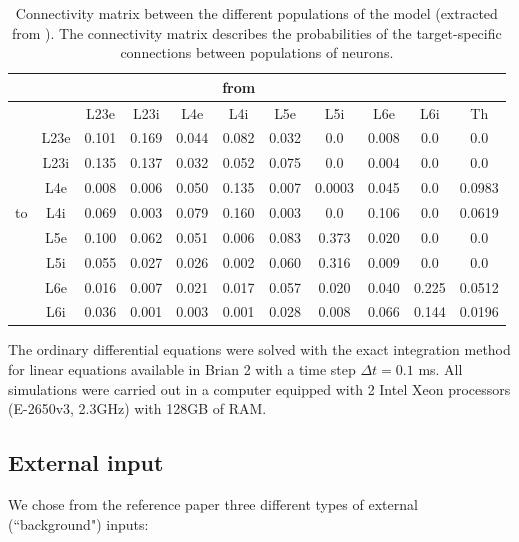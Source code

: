 \documentclass[10pt,a4paper,onecolumn]{article}
\begin{document}
\begin{table}[!ht]
\caption{\label{table:conectivity} Connectivity matrix between the different populations of the model (extracted from \cite{potjans2014}). The connectivity matrix describes the probabilities of the target-specific connections between populations of neurons.
}
\begin{center}
\begin{tabular}{lcccccccccc}
 \toprule
 \midrule
 &  &  &  &  & from &  &  &  & \tabularnewline
  \midrule
 &  & L23e & L23i & L4e & L4i & L5e & L5i & L6e & L6i & Th\tabularnewline
 \midrule
 & L23e & 0.101 & 0.169 & 0.044 & 0.082 & 0.032 & 0.0 & 0.008 & 0.0&0.0\tabularnewline
 & L23i & 0.135 & 0.137 & 0.032 & 0.052 & 0.075 & 0.0 & 0.004 & 0.0&0.0\tabularnewline
 & L4e & 0.008 & 0.006 & 0.050 & 0.135 & 0.007 & 0.0003 & 0.045 & 0.0&0.0983\tabularnewline
 to & L4i & 0.069 & 0.003 & 0.079 & 0.160 & 0.003 & 0.0 & 0.106 & 0.0&0.0619\tabularnewline
 & L5e & 0.100 & 0.062 & 0.051 & 0.006 & 0.083 & 0.373 & 0.020 & 0.0&0.0\tabularnewline
 & L5i & 0.055 & 0.027 & 0.026 & 0.002 & 0.060 & 0.316 & 0.009 & 0.0&0.0\tabularnewline
 & L6e & 0.016 & 0.007 & 0.021 & 0.017 & 0.057 & 0.020 & 0.040 & 0.225&0.0512\tabularnewline
 & L6i & 0.036 & 0.001 & 0.003 & 0.001 & 0.028 & 0.008 & 0.066 & 0.144&0.0196\tabularnewline
\bottomrule
\end{tabular}
\end{center}
\end{table}

The ordinary differential equations were solved with the exact integration method for linear equations available in Brian 2 with a time step $\Delta t=0.1$ ms. All simulations were carried out in a computer equipped with 2 Intel Xeon processors (E-2650v3, 2.3GHz) with 128GB of RAM. 

\subsection{External input}

We chose from the reference paper three different types of external (``background") inputs: 
\end{document}
